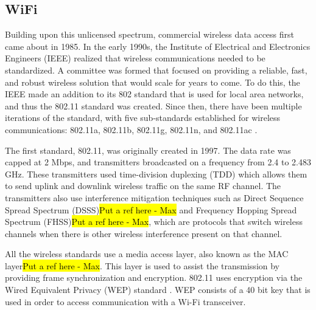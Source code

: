 \subsection{WiFi}
Building upon this unlicensed spectrum, commercial wireless data access first came about in 1985. In the early 1990s, the Institute of Electrical and Electronics Engineers (IEEE) realized that wireless communications needed to be standardized. A committee was formed that focused on providing a reliable, fast, and robust wireless solution that would scale for years to come. To do this, the IEEE made an addition to its 802 standard that is used for local area networks, and thus the 802.11 standard was created. Since then, there have been multiple iterations of the standard, with five sub-standards established for wireless communications: 802.11a, 802.11b, 802.11g, 802.11n, and 802.11ac \cite{bergieee}. \par

The first standard, 802.11, was originally created in 1997. The data rate was capped at 2 Mbps, and transmitters broadcasted on a frequency from 2.4 to 2.483 GHz. These transmitters used time-division duplexing (TDD) which allows them to send uplink and downlink wireless traffic on the same RF channel. The transmitters also use interference mitigation techniques such as Direct Sequence Spread Spectrum (DSSS)\hl{Put a ref here - Max} and Frequency Hopping Spread Spectrum (FHSS)\hl{Put a ref here - Max}, which are protocols that switch wireless channels when there is other wireless interference present on that channel.\par

All the wireless standards use a media access layer, also known as the MAC layer\hl{Put a ref here - Max}. This layer is used to assist the transmission by providing frame synchronization and encryption. 802.11 uses encryption via the Wired Equivalent Privacy (WEP) standard \cite{bergieee}. WEP consists of a 40 bit key that is used in order to access communication with a Wi-Fi transceiver.

